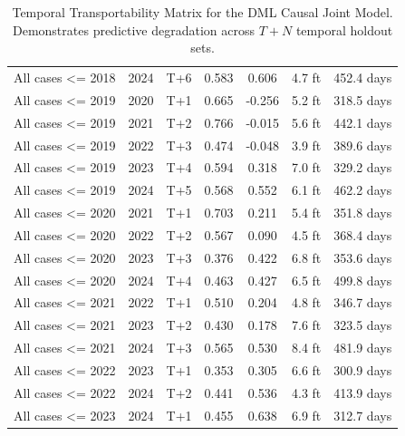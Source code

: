 \begin{table}[H]
{\begin{tabular}{l l l c c c c}
All cases <= 2018 & 2024 & T+6 & 0.583 & 0.606 & 4.7 ft & 452.4 days \\
All cases <= 2019 & 2020 & T+1 & 0.665 & -0.256 & 5.2 ft & 318.5 days \\
All cases <= 2019 & 2021 & T+2 & 0.766 & -0.015 & 5.6 ft & 442.1 days \\
All cases <= 2019 & 2022 & T+3 & 0.474 & -0.048 & 3.9 ft & 389.6 days \\
All cases <= 2019 & 2023 & T+4 & 0.594 & 0.318 & 7.0 ft & 329.2 days \\
All cases <= 2019 & 2024 & T+5 & 0.568 & 0.552 & 6.1 ft & 462.2 days \\
All cases <= 2020 & 2021 & T+1 & 0.703 & 0.211 & 5.4 ft & 351.8 days \\
All cases <= 2020 & 2022 & T+2 & 0.567 & 0.090 & 4.5 ft & 368.4 days \\
All cases <= 2020 & 2023 & T+3 & 0.376 & 0.422 & 6.8 ft & 353.6 days \\
All cases <= 2020 & 2024 & T+4 & 0.463 & 0.427 & 6.5 ft & 499.8 days \\
All cases <= 2021 & 2022 & T+1 & 0.510 & 0.204 & 4.8 ft & 346.7 days \\
All cases <= 2021 & 2023 & T+2 & 0.430 & 0.178 & 7.6 ft & 323.5 days \\
All cases <= 2021 & 2024 & T+3 & 0.565 & 0.530 & 8.4 ft & 481.9 days \\
All cases <= 2022 & 2023 & T+1 & 0.353 & 0.305 & 6.6 ft & 300.9 days \\
All cases <= 2022 & 2024 & T+2 & 0.441 & 0.536 & 4.3 ft & 413.9 days \\
All cases <= 2023 & 2024 & T+1 & 0.455 & 0.638 & 6.9 ft & 312.7 days \\
\bottomrule
\end{tabular}%
}
\caption{Temporal Transportability Matrix for the DML Causal Joint Model. Demonstrates predictive degradation across $T+N$ temporal holdout sets.}
\label{tab:dml_transportability}
\end{table}
